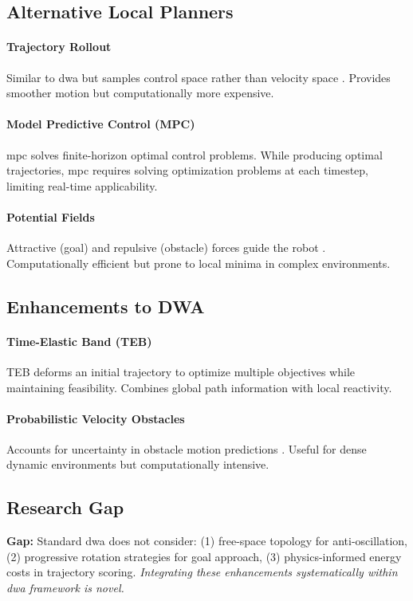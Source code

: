 \subsection{Alternative Local Planners}

\paragraph{Trajectory Rollout}
Similar to \acrshort{dwa} but samples control space rather than velocity space \cite{Gerkey2008}. Provides smoother motion but computationally more expensive.

\paragraph{Model Predictive Control (MPC)}
\acrshort{mpc} \cite{Kuhne2015} solves finite-horizon optimal control problems. While producing optimal trajectories, \acrshort{mpc} requires solving optimization problems at each timestep, limiting real-time applicability.

\paragraph{Potential Fields}
Attractive (goal) and repulsive (obstacle) forces guide the robot \cite{Khatib1986}. Computationally efficient but prone to local minima in complex environments.

\subsection{Enhancements to DWA}

\paragraph{Time-Elastic Band (TEB)}
TEB \cite{Rosmann2013} deforms an initial trajectory to optimize multiple objectives while maintaining feasibility. Combines global path information with local reactivity.

\paragraph{Probabilistic Velocity Obstacles}
Accounts for uncertainty in obstacle motion predictions \cite{VanDenBerg2011}. Useful for dense dynamic environments but computationally intensive.

\subsection{Research Gap}
\textbf{Gap:} Standard \acrshort{dwa} does not consider: (1) free-space topology for anti-oscillation, (2) progressive rotation strategies for goal approach, (3) physics-informed energy costs in trajectory scoring. \textit{Integrating these enhancements systematically within \acrshort{dwa} framework is novel.}

